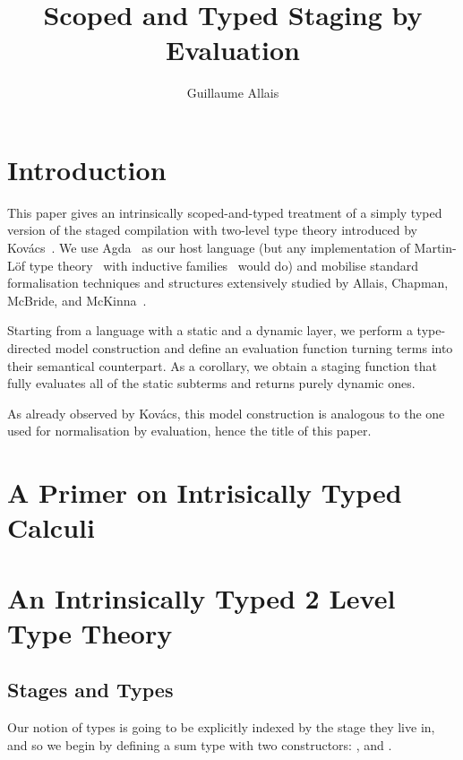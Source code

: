 \documentclass{article}
\title{Scoped and Typed Staging by Evaluation}
\author{Guillaume Allais}
\begin{document}
\maketitle

\section{Introduction}

This paper gives an intrinsically scoped-and-typed
treatment of a simply typed version of the staged compilation
with two-level type theory introduced by
Kov{\'{a}}cs~\cite{DBLP:journals/pacmpl/Kovacs22}.
%
We use Agda~\cite{DBLP:conf/afp/Norell08}
as our host language (but any implementation
of Martin-Löf type theory~\cite{DBLP:books/daglib/0000395}
with inductive families~\cite{DBLP:journals/fac/Dybjer94}
would do)
and mobilise standard formalisation techniques and structures
extensively studied by Allais, Chapman,
McBride, and McKinna~\cite{DBLP:conf/cpp/Allais0MM17}.

Starting from a language with a static and a dynamic layer,
we perform a type-directed model construction
and define an evaluation function turning terms
into their semantical counterpart.
%
As a corollary, we obtain a staging function that
fully evaluates all of the static subterms and returns
purely dynamic ones.

As already observed by Kov{\'{a}}cs, this model construction
is analogous to the one used for normalisation by evaluation,
hence the title of this paper.

\section{A Primer on Intrisically Typed Calculi}

\section{An Intrinsically Typed 2 Level Type Theory}



\subsection{Stages and Types}

Our notion of types is going to be explicitly indexed by the
stage they live in, and so we begin by defining a sum
type  with two constructors: ,
and .
\end{document}
